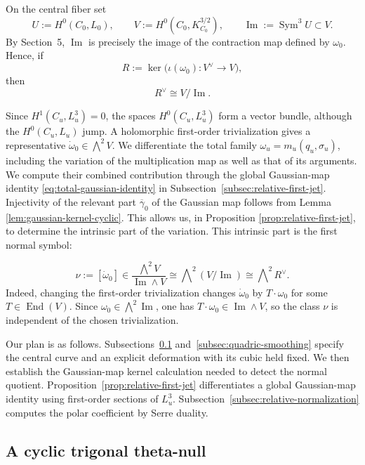 \documentclass[10pt,a4paper]{amsart}
\begin{document}
On the central fiber set
\[
U:=H^0(C_0,L_0),
\qquad
V:=H^0(C_0,K_{C_0}^{3/2}),
\qquad
\operatorname{Im}:=\operatorname{Sym}^3U\subset V.
\]
By Section~5, $\operatorname{Im}$ is precisely the image of the
contraction map defined by $\omega_0$.  Hence, if
\[
R:=\ker\bigl(\iota(\omega_0):V^\vee\longrightarrow V\bigr),
\]
then
\[
R^\vee\cong V/\operatorname{Im}.
\]

\begingroup
Since $H^1(C_u,L_u^3)=0$, the spaces $H^0(C_u,L_u^3)$ form a vector
bundle, {although the $H^0(C_u,L_u)$ jump.} A holomorphic first-order trivialization gives a representative
$\dot\omega_0\in\bigwedge^2V$. We differentiate the total family
$\omega_u=m_u(q_u,\sigma_u)$, including the variation of the
multiplication map as well as that of its arguments. We compute
their combined contribution through the global Gaussian-map
identity
{\eqref{eq:total-gaussian-identity}}
in Subsection~\ref{subsec:relative-first-jet}.
{Injectivity of the relevant part $\overline{\gamma}_0$ of the Gaussian map
follows from Lemma \ref{lem:gaussian-kernel-cyclic}.
This allows us, in Proposition \ref{prop:relative-first-jet},
to determine the intrinsic part of the variation.
This intrinsic part is the first normal symbol:}
\endgroup


\begin{equation}
\label{eq:intrinsic-first-normal-symbol}
\nu:=[\dot\omega_0]
\in
\frac{\bigwedge^2V}{\operatorname{Im}\wedge V}
\cong
\bigwedge\nolimits^2(V/\operatorname{Im})
\cong
\bigwedge\nolimits^2R^\vee.
\end{equation}
Indeed, changing the first-order trivialization changes
$\dot\omega_0$ by $T\cdot\omega_0$ for some $T\in\operatorname{End}(V)$.
Since $\omega_0\in\bigwedge^2\operatorname{Im}$, one has
${T}\cdot\omega_0\in\operatorname{Im}\wedge V$, so the class $\nu$ is independent of
the chosen trivialization.

Our plan is as follows. Subsections~\ref{subsec:cyclic-theta-null}
and~\ref{subsec:quadric-smoothing} specify the central curve and {an}
explicit deformation with its cubic held fixed. We then establish the
Gaussian-map kernel calculation needed to detect the normal quotient.
Proposition~\ref{prop:relative-first-jet} differentiates a global
Gaussian-map identity using
first-order sections of $L_u^3$.
Subsection~\ref{subsec:relative-normalization} computes the polar
coefficient by Serre duality.



\subsection{A cyclic trigonal theta-null}
\label{subsec:cyclic-theta-null}
\end{document}
